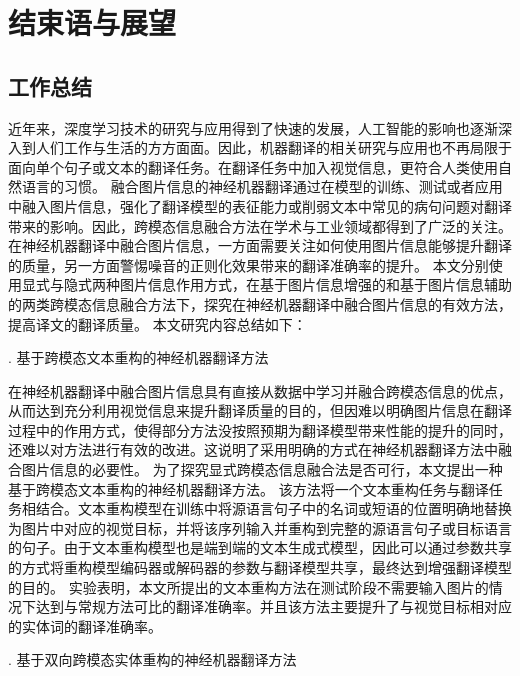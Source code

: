 \chapter{结束语与展望}

\section{工作总结}
近年来，深度学习技术的研究与应用得到了快速的发展，人工智能的影响也逐渐深入到人们工作与生活的方方面面。因此，机器翻译的相关研究与应用也不再局限于面向单个句子或文本的翻译任务。在翻译任务中加入视觉信息，更符合人类使用自然语言的习惯。
融合图片信息的神经机器翻译通过在模型的训练、测试或者应用中融入图片信息，强化了翻译模型的表征能力或削弱文本中常见的病句问题对翻译带来的影响。因此，跨模态信息融合方法在学术与工业领域都得到了广泛的关注。
在神经机器翻译中融合图片信息，一方面需要关注如何使用图片信息能够提升翻译的质量，另一方面警惕噪音的正则化效果带来的翻译准确率的提升。
本文分别使用显式与隐式两种图片信息作用方式，在基于图片信息增强的和基于图片信息辅助的两类跨模态信息融合方法下，探究在神经机器翻译中融合图片信息的有效方法，提高译文的翻译质量。
本文研究内容总结如下：

{. 基于跨模态文本重构的神经机器翻译方法}

在神经机器翻译中融合图片信息具有直接从数据中学习并融合跨模态信息的优点，从而达到充分利用视觉信息来提升翻译质量的目的，但因难以明确图片信息在翻译过程中的作用方式，使得部分方法没按照预期为翻译模型带来性能的提升的同时，还难以对方法进行有效的改进。这说明了采用明确的方式在神经机器翻译方法中融合图片信息的必要性。
为了探究显式跨模态信息融合法是否可行，本文提出一种基于跨模态文本重构的神经机器翻译方法。
该方法将一个文本重构任务与翻译任务相结合。文本重构模型在训练中将源语言句子中的名词或短语的位置明确地替换为图片中对应的视觉目标，并将该序列输入并重构到完整的源语言句子或目标语言的句子。由于文本重构模型也是端到端的文本生成式模型，因此可以通过参数共享的方式将重构模型编码器或解码器的参数与翻译模型共享，最终达到增强翻译模型的目的。
实验表明，本文所提出的文本重构方法在测试阶段不需要输入图片的情况下达到与常规方法可比的翻译准确率。并且该方法主要提升了与视觉目标相对应的实体词的翻译准确率。

{. 基于双向跨模态实体重构的神经机器翻译方法}

